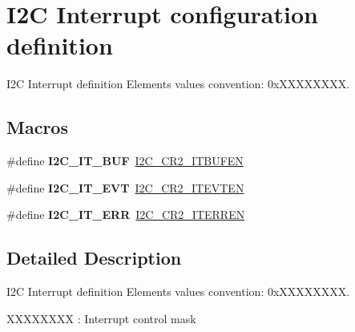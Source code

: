 \hypertarget{group___i2_c___interrupt__configuration__definition}{}\section{I2C Interrupt configuration definition}
\label{group___i2_c___interrupt__configuration__definition}


I2C Interrupt definition Elements values convention\+: 0x\+X\+X\+X\+X\+X\+X\+XX.  


\subsection*{Macros}
\begin{DoxyCompactItemize}
\item 
\mbox{\label{group___i2_c___interrupt__configuration__definition_gad3ff3f405b882aa4d2f91310aa1cc0df}} 
\#define {\bfseries I2\+C\+\_\+\+I\+T\+\_\+\+B\+UF}~\hyperlink{group___peripheral___registers___bits___definition_ga2efbe5d96ed0ce447a45a62e8317a68a}{I2\+C\+\_\+\+C\+R2\+\_\+\+I\+T\+B\+U\+F\+EN}
\item 
\mbox{\label{group___i2_c___interrupt__configuration__definition_gadd59efa313e1598a084a1e5ec3905b02}} 
\#define {\bfseries I2\+C\+\_\+\+I\+T\+\_\+\+E\+VT}~\hyperlink{group___peripheral___registers___bits___definition_ga3b1ebaf8173090ec469b055b98e585d2}{I2\+C\+\_\+\+C\+R2\+\_\+\+I\+T\+E\+V\+T\+EN}
\item 
\mbox{\label{group___i2_c___interrupt__configuration__definition_gadba3667b439cbf4ba1e6e9aec961ab03}} 
\#define {\bfseries I2\+C\+\_\+\+I\+T\+\_\+\+E\+RR}~\hyperlink{group___peripheral___registers___bits___definition_ga6f14ae48e4609c2b3645211234cba974}{I2\+C\+\_\+\+C\+R2\+\_\+\+I\+T\+E\+R\+R\+EN}
\end{DoxyCompactItemize}


\subsection{Detailed Description}
I2C Interrupt definition Elements values convention\+: 0x\+X\+X\+X\+X\+X\+X\+XX. 


\begin{DoxyItemize}
\item X\+X\+X\+X\+X\+X\+XX \+: Interrupt control mask 
\end{DoxyItemize}